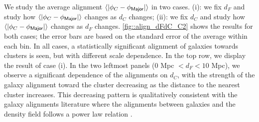 \documentclass[usenatbib,useAMS]{mnras}
\theoremstyle{remark}
\newcommand{\sukhdeep}[1]{{\textcolor{magenta}{SS: #1}}}
\newcommand{\rachel}[1]{{\textcolor{cyan}{RM: #1}}}
\newcommand{\jab}[1]{{\textcolor{red}{JAB: #1}}}
\begin{document}
We study the {average} alignment $\langle|\phi_C-\phi_{\sf Major}|\rangle$ 
in two cases. (i): we fix $d_F$ and study how $\langle|\phi_C-\phi_{\sf Major}|\rangle$ changes as $d_C$ changes; 
(ii): we fix $d_C$ and study how $\langle|\phi_C-\phi_{\sf Major}|\rangle$ changes as $d_F$ changes.
\autoref{fig::align_dFdC_C2} shows the results for both cases;
the error bars are based on the standard error of the average within each bin.
In all cases, a statistically significant alignment of galaxies towards clusters is seen, but with
different scale dependence.  
In the top row, we display the result of case (i).
In the two leftmost panels ($0$ Mpc $<d_F<10$ Mpc), we observe a significant dependence of the
alignments on $d_C$, 
with 
the strength of the galaxy alignment toward the cluster decreasing as the distance to the nearest cluster increases.  
This decreasing pattern 
is qualitatively consistent with the galaxy alignments literature where the alignments between galaxies and the density field follows a power law relation
\citep[see e.g. ][ for a review of galaxy alignment measurements]{2015SSRv..193..139K}. 
\end{document}
